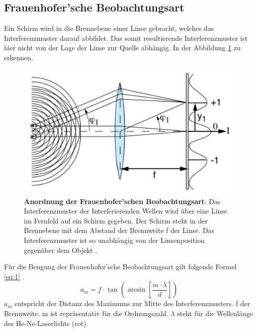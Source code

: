 \subsection{Frauenhofer'sche Beobachtungsart}
\label{subsec:frauenhofBeobachtungsart}
Ein Schirm wird in die Brennebene einer Linse gebracht, welches das Interferenzmuster darauf abbildet. Das somit resultierende Interferenzmuster ist hier nicht von der Lage der Linse zur Quelle abhängig. In der Abbildung \ref{fig:Frauenhofer} zu erkennen.\\
\begin{figure}[h]
\begin{center}
\includegraphics[scale=0.8]{Bilder/Frauenhofer.png}
\end{center}
\caption[Anordnung der Frauenhofer'schen Beobachtungsart]{\textbf{Anordnung der Frauenhofer'schen Beobachtungsart}: Das Interferenzmuster der Interferierenden Wellen wird über eine Linse im Fernfeld auf ein Schirm gegeben. Der Schirm steht in der Brennebene mit dem Abstand der Brennweite f der Linse. Das Interferenzmuster ist so unabhängig von der Linsenposition gegenüber dem Objekt \cite{Angaben2011}.}
\label{fig:Frauenhofer}
\end{figure}

Für die Beugung der Frauenhofer’sche Beobachtungsart gilt folgende Formel \ref{eq:1} \cite{Angaben2011}.\\
\begin{equation}
a_{m}=f\cdot\tan\left( \arcsin\left[ \frac{m\cdot\lambda}{d}\right] \right) 
\label{eq:1}
\end{equation}
$a_{m}$ entspricht der Distanz des Maximums zur Mitte des Interferenzmusters. f der Brennweite. m ist repräsentativ für die Ordnungszahl. $\lambda$ steht für die Wellenlänge des He-Ne-Laserlichts (rot).\\

